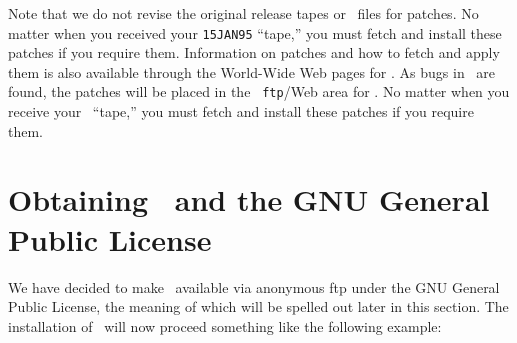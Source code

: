 \vspace{-8pt}
Note that we do not revise the original release tapes or \tar\ files
for patches.  No matter when you received your {\tt 15JAN95} ``tape,''
you must fetch and install these patches if you require them.
Information on patches and how to fetch and apply them is also
available through the World-Wide Web pages for \hbox{\AIPS}.  As bugs
in \RELEASENAME\ are found, the patches will be placed in the {\tt
ftp}/Web area for \hbox{{\RELEASENAME}}.  No matter when you receive
your \RELEASENAME\ ``tape,'' you must fetch and install these patches
if you require them.

\vfill\eject

\section{Obtaining \AIPS\ and the GNU General Public License}

We have decided to make \AIPS\ available via anonymous ftp under the
GNU General Public License, the meaning of which will be spelled out
later in this section.  The installation of \AIPS\ will now proceed
something like the following example:

